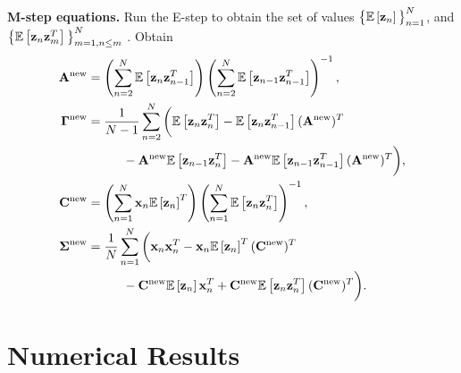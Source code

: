 \documentclass[11pt]{article}
\numberwithin{equation}{section}
\newcommand{\expectation}[1]{\mathbb{E}\left[#1\right]}
\newcommand{\x}{{\bf x}}
\newcommand{\z}{{\bf z}}
\begin{document}
\begin{tcolorbox}
\textbf{M-step equations.}
	Run the E-step to obtain the set of values $\big\{\expectation{\z_n}\big\}_{n=1}^N$, and $\big\{\expectation{\z_n\z_m^T}\big\}_{m=1, n\leq m}^N$ . Obtain
	\begin{align}
		{\bf A}^{\text{\normalfont new}} &= \left(\sum_{n=2}^N \expectation{\z_n \z_{n-1}^T}\right)\left(\sum_{n=2}^N \expectation{\z_{n-1}\z_{n-1}^T}\right)^{-1} \label{eq:mstep-A-final},\\
		\boldsymbol{\Gamma}^{\text{\normalfont new}} &= \frac{1}{N-1}\sum_{n=2}^N\bigg( \expectation{\z_n \z_n^T} - \expectation{\z_n \z_{n-1}^T}({\bf A}^{\text{\normalfont new}})^T \nonumber\\
		&\hspace{1cm} - {\bf A}^{\text{\normalfont new}}\expectation{\z_{n-1}\z_n^T} - {\bf A}^{\text{\normalfont new}}\expectation{\z_{n-1} \z_{n-1}^T}({\bf A}^{\text{\normalfont new}})^T \bigg), \label{eq:mstep-Gamma-final}\\
		{\bf C}^{\text{\normalfont new}} &= \left(\sum_{n=1}^N \x_n \expectation{\z_n}^T \right)\left(\sum_{n=1}^N \expectation{\z_n \z_n^T} \right)^{-1}, \label{eq:mstep-C-final}\\
		\boldsymbol{\Sigma}^{\text{\normalfont new}} &= \frac{1}{N}\sum_{n=1}^N\bigg(\x_n\x_n^T - \x_n \expectation{\z_n}^T ({\bf C}^{\text{\normalfont new}})^T \nonumber\\
		&\hspace{1cm} - {\bf C}^{\text{\normalfont new}}\expectation{\z_n}\x_n^T + {\bf C}^{\text{\normalfont new}} \expectation{\z_n \z_n^T}({\bf C}^{\text{\normalfont new}})^T \bigg). \label{eq:mstep-Sigma-final}
	\end{align}
\end{tcolorbox}

\section{Numerical Results}
\end{document}

